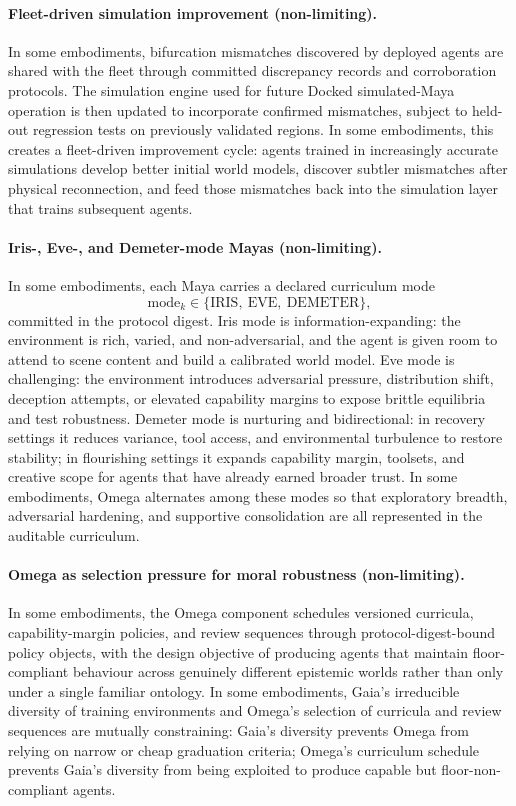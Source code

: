 \documentclass[a4paper,12pt]{article}
\begin{document}
\paragraph{Fleet-driven simulation improvement (non-limiting).}

In some embodiments, bifurcation mismatches discovered by deployed
agents are shared with the fleet through committed discrepancy records
and corroboration protocols. The simulation engine used for future
Docked simulated-Maya operation is then updated to incorporate confirmed
mismatches, subject to held-out regression tests on previously
validated regions. In some embodiments, this creates a fleet-driven
improvement cycle: agents trained in increasingly accurate simulations
develop better initial world models, discover subtler mismatches after
physical reconnection, and feed those mismatches back into the
simulation layer that trains subsequent agents.

\paragraph{Iris-, Eve-, and Demeter-mode Mayas (non-limiting).}

In some embodiments, each Maya carries a declared curriculum mode
\[
  \mathrm{mode}_k \in \{\mathrm{IRIS},\ \mathrm{EVE},\ \mathrm{DEMETER}\},
\]
committed in the protocol digest. Iris mode is information-expanding:
the environment is rich, varied, and non-adversarial, and the agent is
given room to attend to scene content and build a calibrated world
model. Eve mode is challenging: the environment introduces adversarial
pressure, distribution shift, deception attempts, or elevated
capability margins to expose brittle equilibria and test robustness.
Demeter mode is nurturing and bidirectional: in recovery settings it
reduces variance, tool access, and environmental turbulence to restore
stability; in flourishing settings it expands capability margin,
toolsets, and creative scope for agents that have already earned
broader trust. In some embodiments, Omega alternates among these modes
so that exploratory breadth, adversarial hardening, and supportive
consolidation are all represented in the auditable curriculum.

\paragraph{Omega as selection pressure for moral robustness (non-limiting).}

In some embodiments, the Omega component schedules versioned
curricula, capability-margin policies, and review sequences through
protocol-digest-bound policy objects, with the design objective of
producing agents that maintain floor-compliant behaviour across
genuinely different epistemic worlds rather than only under a single
familiar ontology. In some embodiments, Gaia's irreducible diversity
of training environments and Omega's selection of curricula and
review sequences are mutually constraining: Gaia's diversity
prevents Omega from relying on narrow or cheap graduation criteria;
Omega's curriculum schedule prevents Gaia's diversity from being
exploited to produce capable but floor-non-compliant agents.
\end{document}
